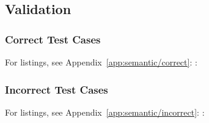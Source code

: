 \subsection{Validation}

\subsubsection{Correct Test Cases}

For listings, see Appendix~\ref{app:semantic/correct}: :



\subsubsection{Incorrect Test Cases}

For listings, see Appendix~\ref{app:semantic/incorrect}: :



%
